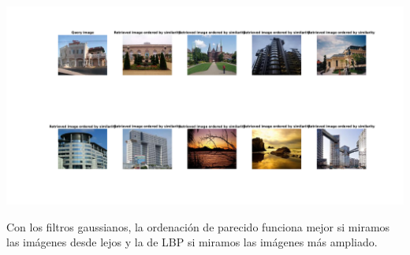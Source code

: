 \documentclass{article}
\begin{document}
\begin{enumerate}
\begin{enumerate}
 \begin{center}
	\includegraphics[width=\textwidth]{im42(3).png}
\end{center} 
 
 Con los filtros gaussianos, la ordenación de parecido funciona mejor si miramos las imágenes desde lejos y la de LBP si miramos las imágenes más ampliado.
 
 \end{enumerate}

\end{enumerate}
\end{document}
